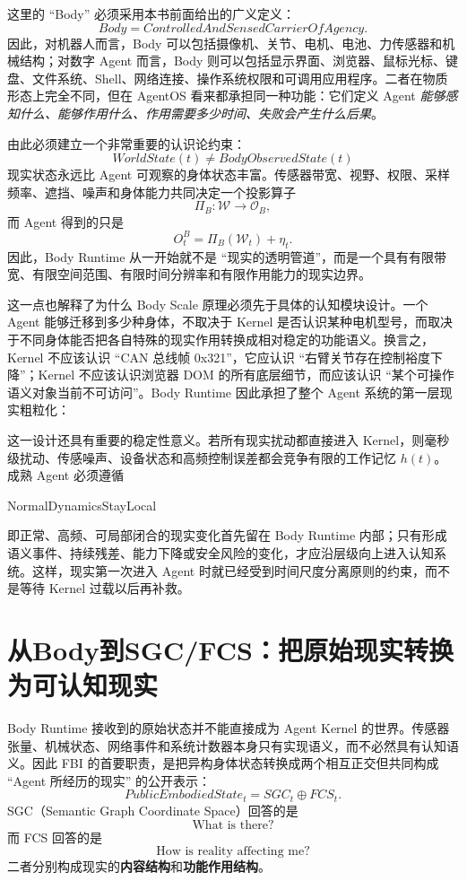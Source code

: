这里的 ``Body'' 必须采用本书前面给出的广义定义：
\[
\boxed{
Body
=
ControlledAndSensedCarrierOfAgency .
}
\]
因此，对机器人而言，Body 可以包括摄像机、关节、电机、电池、力传感器和机械结构；对数字 Agent 而言，Body 则可以包括显示界面、浏览器、鼠标光标、键盘、文件系统、Shell、网络连接、操作系统权限和可调用应用程序。二者在物质形态上完全不同，但在 AgentOS 看来都承担同一种功能：它们定义 Agent \emph{能够感知什么、能够作用什么、作用需要多少时间、失败会产生什么后果}。

由此必须建立一个非常重要的认识论约束：
\[
\boxed{
WorldState(t)
\neq
BodyObservedState(t)
}
\]
现实状态永远比 Agent 可观察的身体状态丰富。传感器带宽、视野、权限、采样频率、遮挡、噪声和身体能力共同决定一个投影算子
\[
\Pi_B:\mathcal W\rightarrow\mathcal O_B ,
\]
而 Agent 得到的只是
\[
O^B_t=\Pi_B(\mathcal W_t)+\eta_t .
\]
因此，Body Runtime 从一开始就不是 ``现实的透明管道''，而是一个具有有限带宽、有限空间范围、有限时间分辨率和有限作用能力的现实边界。

这一点也解释了为什么 Body Scale 原理必须先于具体的认知模块设计。一个 Agent 能够迁移到多少种身体，不取决于 Kernel 是否认识某种电机型号，而取决于不同身体能否把各自特殊的现实作用转换成相对稳定的功能语义。换言之，Kernel 不应该认识 ``CAN 总线帧 0x321''，它应认识 ``右臂关节存在控制裕度下降''；Kernel 不应该认识浏览器 DOM 的所有底层细节，而应该认识 ``某个可操作语义对象当前不可访问''。Body Runtime 因此承担了整个 Agent 系统的第一层现实粗粒化：
\begin{statementbox}
\centering
{}
\end{statementbox}

这一设计还具有重要的稳定性意义。若所有现实扰动都直接进入 Kernel，则毫秒级扰动、传感噪声、设备状态和高频控制误差都会竞争有限的工作记忆 $h(t)$。成熟 Agent 必须遵循
\begin{statementbox}
NormalDynamicsStayLocal
\end{statementbox}
即正常、高频、可局部闭合的现实变化首先留在 Body Runtime 内部；只有形成语义事件、持续残差、能力下降或安全风险的变化，才应沿层级向上进入认知系统。这样，现实第一次进入 Agent 时就已经受到时间尺度分离原则的约束，而不是等待 Kernel 过载以后再补救。


\section{从Body到SGC/FCS：把原始现实转换为可认知现实}

Body Runtime 接收到的原始状态并不能直接成为 Agent Kernel 的世界。传感器张量、机械状态、网络事件和系统计数器本身只有实现语义，而不必然具有认知语义。因此 FBI 的首要职责，是把异构身体状态转换成两个相互正交但共同构成 ``Agent 所经历的现实'' 的公开表示：
\[
\boxed{
PublicEmbodiedState_t
=
SGC_t
\oplus
FCS_t .
}
\]
SGC（Semantic Graph Coordinate Space）回答的是
\[
\text{What is there?}
\]
而 FCS 回答的是
\[
\text{How is reality affecting me?}
\]
二者分别构成现实的\textbf{内容结构}和\textbf{功能作用结构}。

